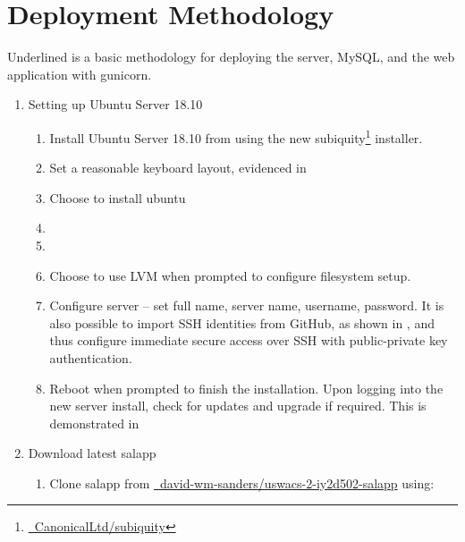 \section{Deployment Methodology}
Underlined is a basic methodology for deploying the server, MySQL, and the web application with gunicorn.

\begin{enumerate}
  \item Setting up Ubuntu Server 18.10
    \begin{enumerate}[label=\roman*:]
      \item Install Ubuntu Server 18.10 from  using the new subiquity\footnote{\href{https://github.com/CanonicalLtd/subiquity}{\faGithub\ CanonicalLtd/subiquity}} installer. 
      \item Set a reasonable keyboard layout, evidenced in  
      \item Choose to install ubuntu  
      \item {}
      \item {}
      \item Choose to use LVM when prompted to configure filesystem setup.  
      \item Configure server -- set full name, server name, username, password. It is also possible to import SSH identities from GitHub, as shown in , and thus configure immediate secure access over SSH with public-private key authentication.
      \item Reboot when prompted to finish the installation. Upon logging into the new server install, check for updates and upgrade if required. This is demonstrated in 
    \end{enumerate}
  \item Download latest salapp
    \begin{enumerate}[label=\roman*:]
      \item Clone salapp from \href{https://github.com/david-wm-sanders/uswacs-2-iy2d502-salapp}{\faGithub\ david-wm-sanders/uswacs-2-iy2d502-salapp} using:\\

\end{enumerate}
\end{enumerate}
